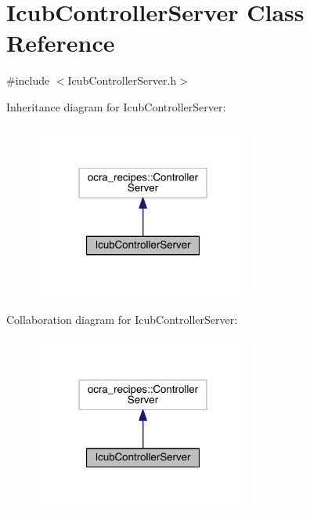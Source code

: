 \hypertarget{classIcubControllerServer}{}\section{Icub\+Controller\+Server Class Reference}
\label{classIcubControllerServer}


{\ttfamily \#include $<$Icub\+Controller\+Server.\+h$>$}



Inheritance diagram for Icub\+Controller\+Server\+:\nopagebreak
\begin{figure}[H]
\begin{center}
\leavevmode
\includegraphics[width=202pt]{classIcubControllerServer__inherit__graph}
\end{center}
\end{figure}


Collaboration diagram for Icub\+Controller\+Server\+:\nopagebreak
\begin{figure}[H]
\begin{center}
\leavevmode
\includegraphics[width=202pt]{classIcubControllerServer__coll__graph}
\end{center}
\end{figure}
